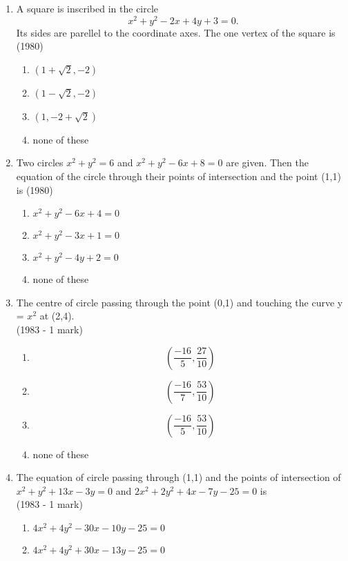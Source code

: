 \documentclass[journal,12pt,twocolumn]{IEEEtran}
\theoremstyle{remark}
\begin{document}
\begin{enumerate}[label=\arabic*.]
    \item A square is inscribed in the circle \[\ x^{2} + y^{2} - 2x +4y +3= 0.\] Its sides are parellel to the coordinate axes. The one vertex of the square is \hfill {(1980)}
    \begin{enumerate}[label=(\alph*)]
    \item $(1+\sqrt{2}, -2)$ 
    \item $(1-\sqrt{2}, -2)$
    \item $(1, -2 +\sqrt{2})$
    \item none of these
    \end{enumerate}
    \item Two circles $x^{2} + y^{2} = 6$ and $x^{2} + y^{2}-6x +8=0$ are given. Then the equation of the circle through their points of intersection and the point (1,1) is \hfill {(1980)}
    \begin{enumerate}[label=(\alph*)]
    \item $x^{2}+y^{2}-6x+4=0$ 
    \item $x^{2}+y^{2}-3x+1=0$
    \item $x^{2}+y^{2}-4y+2=0$
    \item none of these
    \end{enumerate}
    \item The centre of circle passing through the point (0,1) and touching the curve y = $x^{2}$ at (2,4).\\
    \hspace*{2in} {(1983 - 1 mark)}
    \begin{enumerate}[label=(\alph*)]
    \item \[\left(\frac{-16}{5},\frac{27}{10}\right)\]
    \item \[\left(\frac{-16}{7},\frac{53}{10}\right)\]
    \item \[\left(\frac{-16}{5},\frac{53}{10}\right)\]
    \item none of these
    \end{enumerate}
    \item The equation of circle passing through (1,1) and the points of intersection of $x^{2}+y^{2}+13x-3y=0$ and $2x^{2}+2y^{2}+4x-7y-25=0$ is\\
    \hspace*{2in} {(1983 - 1 mark)}
    \begin{enumerate}[label=(\alph*)]
    \item $4x^{2}+4y^{2}-30x-10y-25=0$
    \item $4x^{2}+4y^{2}+30x-13y-25=0$

\end{enumerate}
\end{enumerate}
\end{document}
